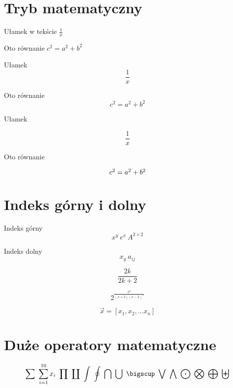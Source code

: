 \documentclass[a4paper,12pt]{article}
\title{}
\author{}
\begin{document}
\maketitle

\begin{abstract}

\end{abstract}

\section{Tryb matematyczny}

Ułamek w tekście $ \frac{1}{x} $ 

Oto równanie $c^{2}=a^{2}+b^{2}$

Ułamek $$ \frac{1}{x} $$

Oto równanie $$c^{2}=a^{2}+b^{2}$$


Ułamek 

\begin{equation}
\frac{1}{x}
\label{eq:rownanie1}
\end{equation}

Oto równanie

\begin{equation}
$$c^{2}=a^{2}+b^{2}$$
\label{eq:rownanie2}
\end{equation}

\section{Indeks górny i dolny}

Indeks górny $$x^{y}  \  e^{x} \ A^{2 \times 2}$$

Indeks dolny$$ x_y \ a_{ij} $$

$$ \frac{2{k}}{2{k+2}} $$

$$ 2^\frac{x^{2}}{(x+2)(x-2)^{3}} $$

$$ \vec{x}=[x_1,x_2,...x_n]$$

\section{Duże operatory matematyczne}

$$\sum \ \sum_{i=1}^{10}x_{i} \ \prod \ \coprod \ \int \ \oint \ \bigcap \ \bigcup\ \bigscup \ \bigvee \ \bigwedge \ \bigodot \ \bigotimes \ \bigoplus \ \biguplus$$
\end{document}

